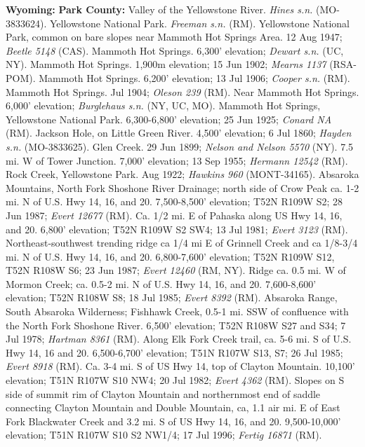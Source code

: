   \textbf{Wyoming:}
  \textbf{Park County:}
Valley of the Yellowstone River. \textit{Hines s.n.} (MO-3833624).
Yellowstone National Park. \textit{Freeman s.n.} (RM).
Yellowstone National Park, common on bare slopes near Mammoth Hot Springs Area.
12 Aug 1947; \textit{Beetle 5148} (CAS).
Mammoth Hot Springs. 6,300' elevation; \textit{Dewart s.n.} (UC, NY).
Mammoth Hot Springs. 1,900m elevation; 15 Jun 1902;
\textit{Mearns 1137} (RSA-POM).
Mammoth Hot Springs. 6,200' elevation; 13 Jul 1906; \textit{Cooper s.n.} (RM).
Mammoth Hot Springs. Jul 1904; \textit{Oleson 239} (RM).
Near Mammoth Hot Springs. 6,000' elevation;
\textit{Burglehaus s.n.} (NY, UC, MO).
Mammoth Hot Springs, Yellowstone National Park. 6,300-6,800' elevation;
25 Jun 1925; \textit{Conard NA} (RM).
Jackson Hole, on Little Green River. 4,500' elevation; 6 Jul 1860;
\textit{Hayden s.n.} (MO-3833625).
Glen Creek. 29 Jun 1899; \textit{Nelson and Nelson 5570} (NY).
7.5 mi. W of Tower Junction. 7,000' elevation; 13 Sep 1955;
\textit{Hermann 12542} (RM).
Rock Creek, Yellowstone Park. Aug 1922; \textit{Hawkins 960} (MONT-34165).
Absaroka Mountains, North Fork Shoshone River Drainage; north side of Crow Peak
ca. 1-2 mi. N of U.S. Hwy 14, 16, and 20. 7,500-8,500’ elevation; T52N R109W S2;
28 Jun 1987; \textit{Evert 12677} (RM).
Ca. 1/2 mi. E of Pahaska along US Hwy 14, 16, and 20. 6,800’ elevation;
T52N R109W S2 SW4; 13 Jul 1981; \textit{Evert 3123} (RM).
Northeast-southwest trending ridge ca 1/4 mi E of Grinnell Creek and ca 1/8-3/4
mi. N of U.S. Hwy 14, 16, and 20. 6,800-7,600’ elevation; T52N R109W S12,
T52N R108W S6; 23 Jun 1987; \textit{Evert 12460} (RM, NY).
Ridge ca. 0.5 mi. W of Mormon Creek; ca. 0.5-2 mi. N of U.S. Hwy 14, 16, and 20.
7,600-8,600’ elevation; T52N R108W S8; 18 Jul 1985; \textit{Evert 8392} (RM).
Absaroka Range, South Absaroka Wilderness; Fishhawk Creek, 0.5-1 mi. SSW of
confluence with the North Fork Shoshone River. 6,500’ elevation;
T52N R108W S27 and S34; 7 Jul 1978; \textit{Hartman 8361} (RM).
Along Elk Fork Creek trail, ca. 5-6 mi. S of U.S. Hwy 14, 16 and 20.
6,500-6,700’ elevation; T51N R107W S13, S7; 26 Jul 1985;
\textit{Evert 8918} (RM).
Ca. 3-4 mi. S of US Hwy 14, top of Clayton Mountain. 10,100’ elevation;
T51N R107W S10 NW4; 20 Jul 1982; \textit{Evert 4362} (RM).
Slopes on S side of summit rim of Clayton Mountain and northernmost end of
saddle connecting Clayton Mountain and Double Mountain, ca, 1.1 air mi. E of
East Fork Blackwater Creek and 3.2 mi. S of US Hwy 14, 16, and 20. 9,500-10,000’
elevation; T51N R107W S10 S2 NW1/4; 17 Jul 1996; \textit{Fertig 16871} (RM).
